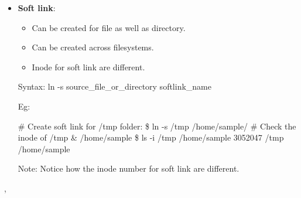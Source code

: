 \begin{flushleft}
\begin{itemize}
\begin{itemize}
			
			\newpage
			\item \textbf{Soft link}:
			\begin{itemize}
				\item Can be created for file as well as directory.
				\item Can be created across filesystems.
				\item Inode for soft link are different.
			\end{itemize}
			\bigskip
			\begin{tcolorbox}[breakable,notitle,boxrule=-0pt,colback=pink,colframe=pink]
				\color{black}
				\font=9pt
				Syntax: ln -s source\_file\_or\_directory  softlink\_name
				\font=4pt
			\end{tcolorbox}
			Eg:
			\begin{tcolorbox}[breakable,notitle,boxrule=-0pt,colback=black,colframe=black]
				
				\font=9pt
				\color{yellow}
				\# Create soft link for /tmp folder:
				\newline
				\color{green}
				\$ ln -s /tmp /home/sample/
				\newline
				\newline
				\color{yellow}
				\# Check the inode of /tmp \&  /home/sample
				\newline
				\color{green}
				\$ ls -i /tmp  /home/sample
				\newline
				\color{white}
				3052047 /tmp
				 /home/sample
				\font=4pt
			\end{tcolorbox}

			\bigskip
			\begin{tcolorbox}[breakable,notitle,boxrule=1pt,colback=yellow,colframe=yellow]
				\color{black}
				Note: Notice how the inode number for soft link are different.
			\end{tcolorbox}


		\end{itemize}
		
	\end{itemize}
	, 
	

	
\end{flushleft}

\newpage

